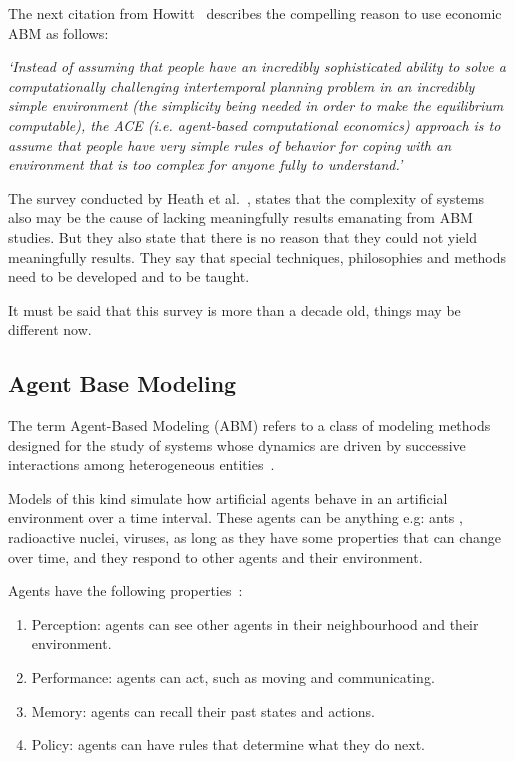The next citation from Howitt~\cite{howitt2012have} describes the compelling reason to use economic ABM as follows:

\textit{`Instead of assuming that people have an incredibly sophisticated ability to solve a computationally challenging intertemporal planning problem in an incredibly simple environment (the simplicity being needed in order to make the equilibrium computable), the ACE (i.e.
agent-based computational economics) approach is to assume that people have very simple rules of behavior for coping with an environment that is too complex for anyone fully to understand.'}

The survey conducted by Heath et al.~\cite{heath2009survey}, states that the complexity of systems also may be the cause of lacking meaningfully results emanating from ABM studies.
But they also state that there is no reason that they could not yield meaningfully results.
They say that special techniques, philosophies and methods need to be developed and to be taught.

It must be said that this survey is more than a decade old, things may be different now.


\subsection{Agent Base Modeling}\label{subsec:agent-base-modeling}
The term Agent-Based Modeling (ABM) refers to a class of modeling methods designed for the study of systems whose dynamics are driven by successive interactions among heterogeneous entities~\cite{tesfatsion2023agent}.

Models of this kind simulate how artificial agents behave in an artificial environment over a time interval.
These agents can be anything e.g: ants , radioactive nuclei, viruses, as long as they have some properties that can change over time, and they respond to other agents and their environment.

Agents have the following properties~\cite{hamill2016agent}:
\begin{enumerate}
  \item Perception: agents can see other agents in their neighbourhood and their environment.
  \item Performance: agents can act, such as moving and communicating.
  \item Memory: agents can recall their past states and actions.
  \item Policy: agents can have rules that determine what they do next.
\end{enumerate}

